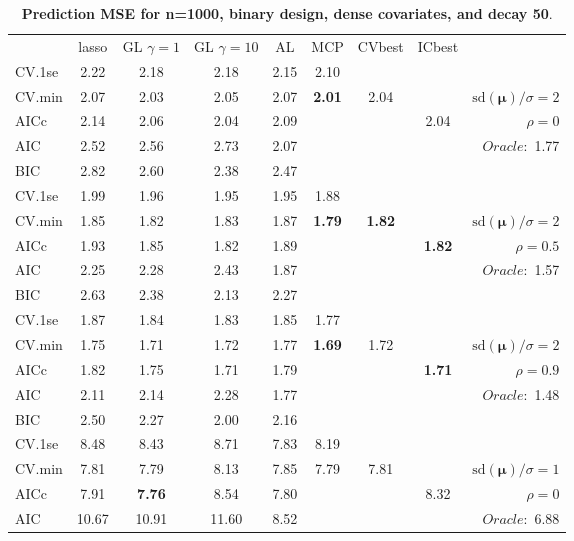\clearpage
\begin{table}\vspace{-.5cm}
\caption[l]{ { \bf Prediction MSE for n=1000, binary design, 
dense covariates, and  decay  50}.}
\vspace{-.5cm}
\footnotesize{}
\begin{center}
\begin{tabular}{l*{7}{c}|r}
 & lasso & GL $\gamma=1$ & GL $\gamma=10$ & AL & MCP  & CVbest & ICbest  \\
\cline{1-9}
CV.1se & 2.22 & 2.18 & 2.18 & 2.15 & 2.10 & & & \\
CV.min & 2.07 & 2.03 & 2.05 & 2.07 & {\bf 2.01} & 2.04 & & $\mathrm{sd}(\mathbf{\mu})/\sigma=2$ \\
AICc & 2.14 & 2.06 & 2.04 & 2.09 & & & 2.04 &  $\rho=0$ \\
AIC & 2.52 & 2.56 & 2.73 & 2.07 & & & &  \multirow{2}{*}{$Oracle: $ 1.77} \\
BIC & 2.82 & 2.60 & 2.38 & 2.47 & & & &  \\
 \hline 
CV.1se & 1.99 & 1.96 & 1.95 & 1.95 & 1.88 & & & \\
CV.min & 1.85 & 1.82 & 1.83 & 1.87 & {\bf 1.79} & {\bf 1.82} & & $\mathrm{sd}(\mathbf{\mu})/\sigma=2$ \\
AICc & 1.93 & 1.85 & 1.82 & 1.89 & & & {\bf 1.82} &  $\rho=0.5$ \\
AIC & 2.25 & 2.28 & 2.43 & 1.87 & & & &  \multirow{2}{*}{$Oracle: $ 1.57} \\
BIC & 2.63 & 2.38 & 2.13 & 2.27 & & & &  \\
 \hline 
CV.1se & 1.87 & 1.84 & 1.83 & 1.85 & 1.77 & & & \\
CV.min & 1.75 & 1.71 & 1.72 & 1.77 & {\bf 1.69} & 1.72 & & $\mathrm{sd}(\mathbf{\mu})/\sigma=2$ \\
AICc & 1.82 & 1.75 & 1.71 & 1.79 & & & {\bf 1.71} &  $\rho=0.9$ \\
AIC & 2.11 & 2.14 & 2.28 & 1.77 & & & &  \multirow{2}{*}{$Oracle: $ 1.48} \\
BIC & 2.50 & 2.27 & 2.00 & 2.16 & & & &  \\
 \hline 
CV.1se & 8.48 & 8.43 & 8.71 & 7.83 & 8.19 & & & \\
CV.min & 7.81 & 7.79 & 8.13 & 7.85 & 7.79 & 7.81 & & $\mathrm{sd}(\mathbf{\mu})/\sigma=1$ \\
AICc & 7.91 & {\bf 7.76} & 8.54 & 7.80 & & & 8.32 &  $\rho=0$ \\
AIC & 10.67 & 10.91 & 11.60 & 8.52 & & & &  \multirow{2}{*}{$Oracle: $ 6.88} \\

\end{tabular}
\end{center}
\end{table}
